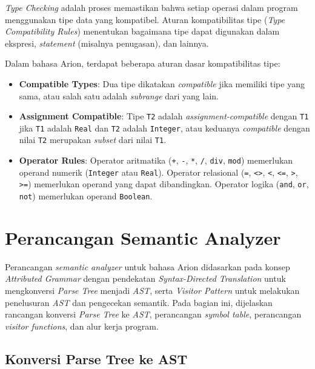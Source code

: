 ﻿\documentclass[12pt,a4paper]{article}
\begin{document}
\textit{Type Checking} adalah proses memastikan bahwa setiap operasi dalam program menggunakan tipe data yang kompatibel. Aturan kompatibilitas tipe (\textit{Type Compatibility Rules}) menentukan bagaimana tipe dapat digunakan dalam ekspresi, \textit{statement} (misalnya penugasan), dan lainnya.

Dalam bahasa Arion, terdapat beberapa aturan dasar kompatibilitas tipe:

\begin{itemize}
    \item \textbf{Compatible Types}: Dua tipe dikatakan \textit{compatible} jika memiliki tipe yang sama, atau salah satu adalah \textit{subrange} dari yang lain.
    \item \textbf{Assignment Compatible}: Tipe \texttt{T2} adalah \textit{assignment-compatible} dengan \texttt{T1} jika \texttt{T1} adalah \texttt{Real} dan \texttt{T2} adalah \texttt{Integer}, atau keduanya \textit{compatible} dengan nilai \texttt{T2} merupakan \textit{subset} dari nilai \texttt{T1}.
    \item \textbf{Operator Rules}: Operator aritmatika (\texttt{+}, \texttt{-}, \texttt{*}, \texttt{/}, \texttt{div}, \texttt{mod}) memerlukan operand numerik (\texttt{Integer} atau \texttt{Real}). Operator relasional (\texttt{=}, \texttt{<>}, \texttt{<}, \texttt{<=}, \texttt{>}, \texttt{>=}) memerlukan operand yang dapat dibandingkan. Operator logika (\texttt{and}, \texttt{or}, \texttt{not}) memerlukan operand \texttt{Boolean}.
\end{itemize}

\section{Perancangan Semantic Analyzer}

Perancangan \textit{semantic analyzer} untuk bahasa Arion didasarkan pada konsep \textit{Attributed Grammar} dengan pendekatan \textit{Syntax-Directed Translation} untuk mengkonversi \textit{Parse Tree} menjadi \textit{AST}, serta \textit{Visitor Pattern} untuk melakukan penelusuran \textit{AST} dan pengecekan semantik. Pada bagian ini, dijelaskan rancangan konversi \textit{Parse Tree} ke \textit{AST}, perancangan \textit{symbol table}, perancangan \textit{visitor functions}, dan alur kerja program.

\subsection{Konversi Parse Tree ke AST}
\end{document}

